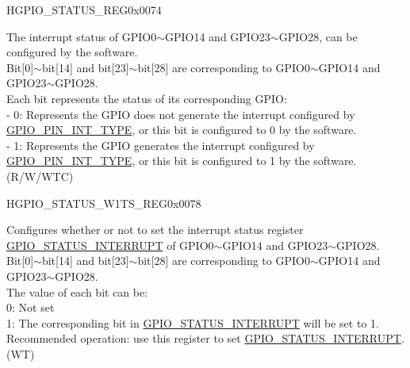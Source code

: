 \begin{register}{H}{GPIO\_STATUS\_REG}{0x0074}\label{regdesc:GPIOSTATUSREG}
%
\regnewline%
\begin{regdesc}\begin{reglist}
\label{fielddesc:GPIOSTATUSINTERRUPT}\item [GPIO\_STATUS\_INTERRUPT] The interrupt status of GPIO0$\sim$GPIO14 and GPIO23$\sim$GPIO28, can be configured by the software. \\
Bit[0]$\sim$bit[14] and bit[23]$\sim$bit[28] are corresponding to GPIO0$\sim$GPIO14 and GPIO23$\sim$GPIO28.\\
Each bit represents the status of its corresponding GPIO:\\
    - 0: Represents the GPIO does not generate the interrupt configured by \hyperref[fielddesc:GPIOPINNINTTYPE]{GPIO\_PIN\_INT\_TYPE}, or this bit is configured to 0 by the software.\\
    - 1: Represents the GPIO generates the interrupt configured by \hyperref[fielddesc:GPIOPINNINTTYPE]{GPIO\_PIN\_INT\_TYPE}, or this bit is configured to 1 by the software.\\
 (R/W/WTC)
\end{reglist}\end{regdesc}
\end{register}


\begin{register}{H}{GPIO\_STATUS\_W1TS\_REG}{0x0078}\label{regdesc:GPIOSTATUSW1TSREG}
%
\regnewline%
\begin{regdesc}\begin{reglist}
\label{fielddesc:GPIOSTATUSW1TS}\item [GPIO\_STATUS\_W1TS] Configures whether or not to set the interrupt status register \hyperref[fielddesc:GPIOSTATUSINTERRUPT]{GPIO\_STATUS\_INTERRUPT} of GPIO0$\sim$GPIO14 and GPIO23$\sim$GPIO28. \\
Bit[0]$\sim$bit[14] and bit[23]$\sim$bit[28] are corresponding to GPIO0$\sim$GPIO14 and GPIO23$\sim$GPIO28.\\
The value of each bit can be:\\
0: Not set\\
1: The corresponding bit in \hyperref[fielddesc:GPIOSTATUSINTERRUPT]{GPIO\_STATUS\_INTERRUPT} will be set to 1. \\
Recommended operation: use this register to set \hyperref[fielddesc:GPIOSTATUSINTERRUPT]{GPIO\_STATUS\_INTERRUPT}. \\
 (WT)
\end{reglist}\end{regdesc}
\end{register}


